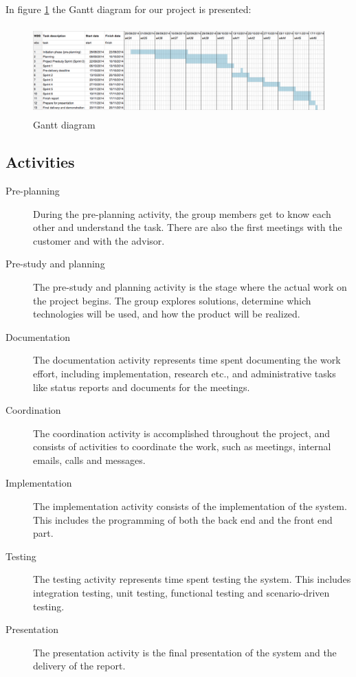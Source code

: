 \documentclass[11pt,a4paper,titlepage,oneside]{report}
\begin{document}
In figure \ref{fig:gantt} the Gantt diagram for our project is presented:
\begin{figure}[h]
\begin{center}
\includegraphics[height=130px,width=440px]{img/gantt.png}
\caption{Gantt diagram}
\label{fig:gantt}
\medskip
\small
\end{center}
\end{figure}

\subsection{Activities}
\begin{description}
\item[Pre-planning] During the pre-planning activity, the group members get to know each other and understand the task. There are also the first meetings with the customer and with the advisor.
\item[Pre-study and planning] The pre-study and planning activity is the stage where the actual work on the project begins. The group explores solutions, determine which technologies will be used, and how the product will be realized.
\item[Documentation] The documentation activity represents time spent documenting the work effort, including implementation, research etc., and administrative tasks like status reports and documents for the meetings.
\item[Coordination] The coordination activity is accomplished throughout the project, and consists of activities to coordinate the work, such as meetings, internal emails, calls and messages.
\item[Implementation] The implementation activity consists of the implementation of the system. This includes the programming of both the back end and the front end part.
\item[Testing] The testing activity represents time spent testing the system. This includes integration testing, unit testing, functional testing and scenario-driven testing.
\item[Presentation] The presentation activity is the final presentation of the system and the delivery of the report.
\end{description}
\end{document}
